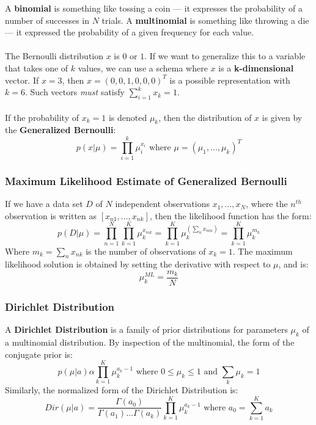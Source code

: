 \documentclass[11pt]{article} %
\begin{document}
A {\bf binomial} is something like tossing a coin --- it expresses the probability of a number of successes in $N$ trials. A {\bf multinomial} is something like throwing a die --- it expressed the probability of a given frequency for each value.\\
~\\
The Bernoulli distribution $x$ is $0$ or $1$. If we want to generalize this to a variable that takes one of $k$ values, we can use a schema where $x$ is a {\bf k-dimensional} vector. If $x=3$, then $x = (0,0,1,0,0,0)^T$ is a possible representation with $k = 6$. Such vectors {\em must} satisfy $\sum_{i=1}^{k} x_k = 1$.\\
~\\
If the probability of $x_k = 1$ is denoted $\mu_k$, then the distribution of $x$ is given by the {\bf Generalized Bernoulli}:
\begin{equation}
p(x|\mu) = \prod_{i=1}^{k} \mu_i^{x_i} \text{ where } \mu = (\mu_1,\ldots,\mu_k)^T
\end{equation}

\subsubsection{Maximum Likelihood Estimate of Generalized Bernoulli}

If we have a data set $D$ of $N$ independent observations $x_1,\ldots,x_N$, where the $n^{th}$ observation is written as $[x_{n1},\ldots,x_{nk}]$, then the likelihood function has the form:
\begin{equation}
p(D|\mu) = \prod_{n=1}^{N}\prod_{k=1}^{K} \mu_k^{x_{mk}} = \prod_{k=1}^{K} \mu_k^{(\sum_n x_{mn})} = \prod_{k=1}^{K} \mu_k^{m_k}
\end{equation}
Where $m_k = \sum_n x_{nk}$ is the number of observations of $x_k = 1$. The maximum likelihood solution is obtained by setting the derivative with respect to $\mu$, and is:
\begin{equation}
\mu_k^{ML} = \frac{m_k}{N}
\end{equation}

\subsubsection{Dirichlet Distribution}

A {\bf Dirichlet Distribution} is a family of prior distributions for parameters $\mu_k$ of a multinomial distribution. By inspection of the multinomial, the form of the conjugate prior is:
\begin{equation}
p(\mu|a) \alpha \prod_{k=1}^{K} \mu_k^{a_k-1} \text{ where } 0 \leq \mu_k \leq 1 \text{ and } \sum_k \mu_k = 1
\end{equation}
Similarly, the normalized form of the Dirichlet Distribution is:
\begin{equation}
Dir(\mu|a) = \frac{\Gamma(a_0)}{\Gamma(a_1)\ldots\Gamma(a_k)}\prod_{k=1}^{K}\mu_k^{a_k-1} \text{ where } a_0 = \sum_{k=1}^{K} a_k
\end{equation}
\end{document}
